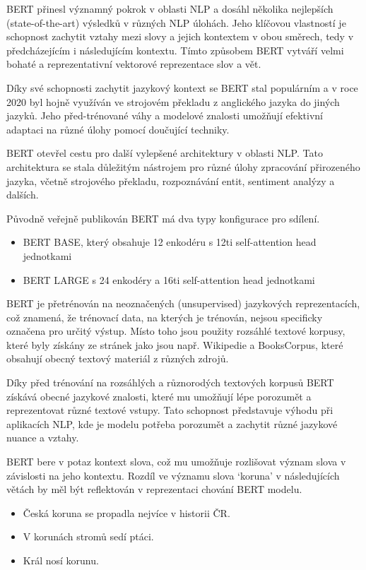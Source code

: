 BERT přinesl významný pokrok v oblasti NLP a dosáhl několika nejlepších (state-of-the-art) výsledků v různých NLP úlohách.
Jeho klíčovou vlastností je schopnost zachytit vztahy mezi slovy a jejich kontextem v obou směrech, tedy v předcházejícím i následujícím kontextu.
Tímto způsobem BERT vytváří velmi bohaté a reprezentativní vektorové reprezentace slov a vět.

Díky své schopnosti zachytit jazykový kontext se BERT stal populárním a v roce 2020 byl hojně využíván ve strojovém překladu z anglického jazyka do jiných jazyků.
Jeho před-trénované váhy a modelové znalosti umožňují efektivní adaptaci na různé úlohy pomocí doučující techniky.

BERT otevřel cestu pro další vylepšené architektury v oblasti NLP.\@
Tato architektura se stala důležitým nástrojem pro různé úlohy zpracování přirozeného jazyka, včetně strojového překladu, rozpoznávání entit, sentiment analýzy a dalších.

Původně veřejně publikován BERT má dva typy konfigurace pro sdílení.

\begin{itemize}
\item BERT BASE, který obsahuje 12 enkodéru s 12ti self-attention head jednotkami
\item BERT LARGE s 24 enkodéry a 16ti self-attention head jednotkami
\end{itemize}

BERT je přetrénován na neoznačených (unsupervised) jazykových reprezentacích, což znamená, že trénovací data, na kterých je trénován, nejsou specificky označena pro určitý výstup.
Místo toho jsou použity rozsáhlé textové korpusy, které byly získány ze stránek jako jsou např. Wikipedie a BooksCorpus, které obsahují obecný textový materiál z různých zdrojů.

Díky před trénování na rozsáhlých a různorodých textových korpusů BERT získává obecné jazykové znalosti, které mu umožňují lépe porozumět a reprezentovat různé textové vstupy.
Tato schopnost představuje výhodu při aplikacích NLP, kde je modelu potřeba porozumět a zachytit různé jazykové nuance a vztahy.

BERT bere v potaz kontext slova, což mu umožňuje rozlišovat význam slova v závislosti na jeho kontextu.
Rozdíl ve významu slova `koruna' v následujících větách by měl být reflektován v reprezentaci chování BERT modelu.

\begin{itemize}
\item Česká koruna se propadla nejvíce v historii ČR.
\item V korunách stromů sedí ptáci.
\item Král nosí korunu.
\end{itemize}

